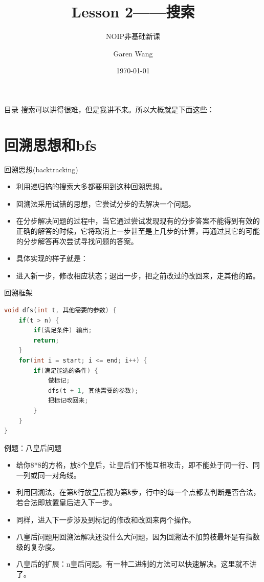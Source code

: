 \documentclass{beamer}[UTF-8]
\title{Lesson 2——搜索}
\subtitle{NOIP非基础新课}
\author{Garen Wang}
\date{\today}
\begin{document}
\maketitle
\begin{frame}{目录}
搜索可以讲得很难，但是我讲不来。所以大概就是下面这些：  \pause
\tableofcontents
\end{frame}

\section{回溯思想和bfs}

\begin{frame}{回溯思想(backtracking)}
  \pause
\begin{itemize}
  \item 利用递归搞的搜索大多都要用到这种回溯思想。 \pause
  \item 回溯法采用试错的思想，它尝试分步的去解决一个问题。 \pause
  \item 在分步解决问题的过程中，当它通过尝试发现现有的分步答案不能得到有效的正确的解答的时候，它将取消上一步甚至是上几步的计算，再通过其它的可能的分步解答再次尝试寻找问题的答案。 \pause
  \item 具体实现的样子就是： \pause
  \item 进入新一步，修改相应状态；退出一步，把之前改过的改回来，走其他的路。
\end{itemize}
\end{frame}

\begin{frame}[fragile]{回溯框架}
\begin{lstlisting}[language = C++,
numberstyle=\tiny,keywordstyle=\color{blue!70},
commentstyle=\color{red!50!green!50!blue!50},frame=shadowbox,
rulesepcolor=\color{red!20!green!20!blue!20},basicstyle=\ttfamily]
void dfs(int t, 其他需要的参数) {
    if(t > n) {
        if(满足条件) 输出;
        return;
    }
    for(int i = start; i <= end; i++) {
        if(满足能选的条件) {
            做标记;
            dfs(t + 1, 其他需要的参数);
            把标记改回来;
        }
    }
}
\end{lstlisting}
\end{frame}

\begin{frame}{例题：八皇后问题}
  \pause
\begin{itemize}
\item 给你8*8的方格，放8个皇后，让皇后们不能互相攻击，即不能处于同一行、同一列或同一对角线。 \pause
\item 利用回溯法，在第𝑘行放皇后视为第𝑘步，行中的每一个点都去判断是否合法，若合法即放置皇后进入下一步。 \pause
\item 同样，进入下一步涉及到标记的修改和改回来两个操作。 \pause
\item 八皇后问题用回溯法解决还没什么大问题，因为回溯法不加剪枝最坏是有指数级的复杂度。 \pause
\item 八皇后的扩展：n皇后问题。有一种二进制的方法可以快速解决。这里就不讲了。
\end{itemize}
\end{frame}
\end{document}
